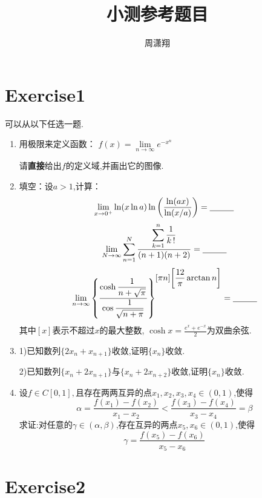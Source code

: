 \documentclass{ctexart}
\begin{document}

\title{小测参考题目} %

\author{周潇翔} %



	\maketitle %
	

	

	\section{Exercise1} 
可以从以下任选一题.
\begin{enumerate}
	\item 用极限来定义函数：
	$f(x)=\lim\limits_{n \rightarrow \infty} e^{-x^n}$

请\textbf{直接}给出$f$的定义域,并画出它的图像.
\item 填空：设$a>1$,计算：$$\lim\limits_{x \rightarrow 0^+} \ln(x \ln a) \ln \bigg(\frac{\ln(ax)}{\ln(x/a)}\bigg)=\underline{\hbox to 10mm{}}$$
$$\lim\limits_{N \rightarrow \infty} \sum_{n=1}^N \frac{\displaystyle \sum\limits_{k=1}^n \frac{1}{k\,!}}{(n+1)(n+2)}=\underline{\hbox to 10mm{}}$$
$$\lim\limits_{n \rightarrow \infty}   \left\{\frac{\displaystyle \cosh \frac{1}{n+ \sqrt{ \pi}}}{ \displaystyle \cos \frac{1}{ \sqrt{n+ \pi}}}\right\}^{\displaystyle [\pi n] {\bigg[\frac{12}{\pi} \arctan n\bigg]}}=\underline{\hbox to 10mm{}}$$	
其中$[x]$表示不超过$x$的最大整数, $\displaystyle \cosh x=\frac{e^x+e^{-x}}{2}$为双曲余弦.

	\item 	1)已知数列$\{2x_n+x_{n+1}\}$收敛,证明$\{x_n\}$收敛.
	
			2)已知数列$\{x_n+2x_{n+1}\}$与$\{x_n+2x_{n+2}\}$收敛,证明$\{x_n\}$收敛.
	\item	设$f \in C[0,1],$且存在两两互异的点$x_1,x_2,x_3,x_4 \in (0,1)$,使得 $$\alpha = \frac{f(x_1)-f(x_2)}{x_1-x_2}<\frac{f(x_3)-f(x_4)}{x_3-x_4}= \beta$$
	求证:对任意的$\gamma \in (\alpha , \beta)$,存在互异的两点$x_5,x_6 \in (0,1)$,使得
$$\gamma = \frac{f(x_5)-f(x_6)}{x_5-x_6}$$	
\end{enumerate}

	\section{Exercise2} 
	
\end{document}
